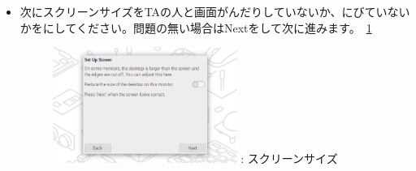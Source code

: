 \documentclass[a4paper,12pt]{jarticle}
\begin{document}
\begin{enumerate}
\begin{itemize}
\begin{figure}[h]
                      \end{figure}
                \end{itemize}
                \begin{itemize}
                  \item
                        次にスクリーンサイズをTAの人と画面がんだりしていないか、にびていないかをにしてください。問題の無い場合はNextをして次に進みます。~\ref{seq:refFigure15}
                        \begin{figure}[h]
                          \centering
                          \begin{minipage}{5.228cm}
                            {\upshape
                              \includegraphics[width=6.000cm]{sw_image05.png}
                              \newline
                              {\theFigure\label{seq:refFigure15}}:
                              スクリーンサイズ}
                          \end{minipage}
                        \end{figure}
                      \end{itemize}  
                      
  \clearpage                   

\end{enumerate}
\end{document}
